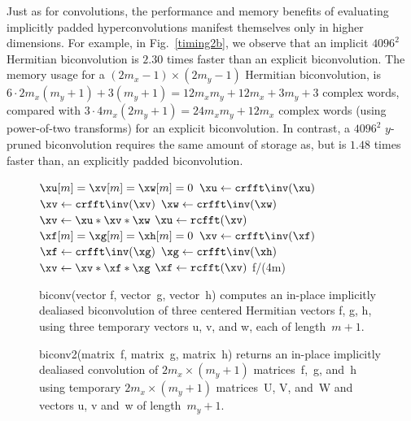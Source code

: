 \documentclass[final]{siamltex}
\begin{document}
Just as for convolutions, the performance and memory benefits of
evaluating implicitly padded hyperconvolutions manifest themselves only in
higher dimensions. For example, in Fig.~\ref{timing2b}, we observe 
that an implicit $4096^2$ Hermitian biconvolution is $2.30$ times
faster than an explicit biconvolution.
The memory usage for a $(2m_x-1)\times (2m_y-1)$ Hermitian biconvolution,
is $6\cdot 2m_x(m_y+1)+3(m_y+1)=12m_xm_y+12m_x+3m_y+3$ complex words,
compared with $3\cdot 4m_x(2m_y+1)=24m_xm_y+12m_x$ complex words
(using power-of-two transforms) for an explicit biconvolution. In contrast, a
$4096^2$ $y$-pruned biconvolution requires the same amount of storage as, but
is $1.48$ times faster than, an explicitly padded biconvolution.

\begin{figure}[htbp]
\begin{minipage}{0.445\linewidth}
\begin{function}[H]
  \medskip
  $\xu[m]=\xv[m]=\xw[m]=0$\;
  $\xu \leftarrow \crfft\inv(\xu)$\;
  $\xv \leftarrow \crfft\inv(\xv)$\;
  $\xw \leftarrow \crfft\inv(\xw)$\;
  $\xv \leftarrow \xu * \xv * \xw$\;
  $\xu \leftarrow \rcfft(\xv)$\;
  \medskip
  $\xf[m]=\xg[m]=\xh[m]=0$\;
  $\xv \leftarrow \crfft\inv(\xf)$\;
  $\xf \leftarrow \crfft\inv(\xg)$\;
  $\xg \leftarrow \crfft\inv(\xh)$\;
  $\xv \leftarrow \xv * \xf * \xg$\;
  $\xf \leftarrow \rcfft(\xv)$\;
  \medskip
  \Return f/(4m)\;
\caption{biconv(vector {\sf f}, vector~{\sf g}, vector~{\sf h}) computes
an in-place implicitly dealiased biconvolution of three centered
Hermitian vectors {\sf f}, {\sf g}, {\sf h}, using three temporary vectors
{\sf u}, {\sf v}, and {\sf w}, each of length~$m+1$.}\label{biconv}
\end{function}
\end{minipage}
%
\begin{minipage}{0.5\linewidth}
\begin{function}[H]
  \Return \xf\;
\caption{biconv2(matrix~{\sf f}, matrix~{\sf g}, matrix~{\sf h}) 
returns an in-place implicitly dealiased convolution of \hbox{$2m_x\times
(m_y+1)$} matrices~{\sf f},~{\sf g}, and~{\sf h} using
temporary \hbox{$2m_x\times (m_y+1)$} matrices~{\sf U}, {\sf V}, and~{\sf W} and
vectors {\sf u}, {\sf v} and~{\sf w} of length~$m_y+1$.
}\label{biconv2}
\end{function}
\end{minipage}
\end{figure}
\end{document}
